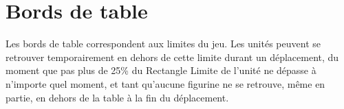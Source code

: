 \section{Bords de table}

Les bords de table correspondent aux limites du jeu. Les unités peuvent se retrouver temporairement en dehors de cette limite durant un déplacement, du moment que pas plus de 25\% du Rectangle Limite de l'unité ne dépasse à n'importe quel moment, et tant qu'aucune figurine ne se retrouve, même en partie, en dehors de la table à la fin du déplacement.

